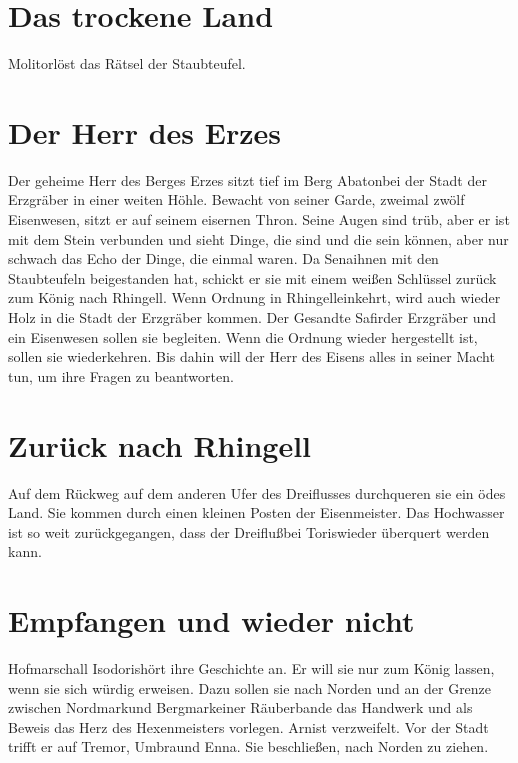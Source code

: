 \documentclass[12pt,a4paper,onecolumn,twoside,ngerman]{book}
\newcommand{\Molitor}{Molitor}
\newcommand{\Sena}{Sena}
\newcommand{\Umbra}{Umbra}
\newcommand{\Enna}{Enna}
\newcommand{\Tremor}{Tremor}
\newcommand{\Nordmark}{Nordmark}
\newcommand{\Bergmark}{Bergmark}
\newcommand{\Arn}{Arn}
\newcommand{\Rhingell}{Rhingell}
\newcommand{\Isodoris}{Isodoris}
\newcommand{\Dreifluss}{Dreifluß}
\newcommand{\Toris}{Toris}
\newcommand{\Eisenmeister}{Eisenmeister}
\newcommand{\Abaton}{Abaton}
\newcommand{\Safir}{Safir}
\newcommand{\Staubteufel}{Staubteufel}
\begin{document}
\section{Das trockene Land}
\Molitor löst das Rätsel der \Staubteufel .

\section{Der Herr des Erzes}
Der geheime Herr des Berges Erzes sitzt tief im Berg \Abaton bei der Stadt der Erzgräber in einer weiten Höhle. Bewacht von seiner Garde, zweimal zwölf Eisenwesen, sitzt er auf seinem eisernen Thron. Seine Augen sind trüb, aber er ist mit dem Stein verbunden und sieht Dinge, die sind und die sein können, aber nur schwach das Echo der Dinge, die einmal waren. 
Da \Sena ihnen mit den Staubteufeln beigestanden hat, schickt er sie mit einem weißen Schlüssel zurück zum König nach \Rhingell . Wenn Ordnung in \Rhingell einkehrt, wird auch wieder Holz in die Stadt der Erzgräber kommen. Der Gesandte \Safir der Erzgräber und ein Eisenwesen sollen sie begleiten. Wenn die Ordnung wieder hergestellt ist, sollen sie wiederkehren. Bis dahin will der Herr des Eisens alles in seiner Macht tun, um ihre Fragen zu beantworten.

\section{Zurück nach \Rhingell}
Auf dem Rückweg auf dem anderen Ufer des Dreiflusses durchqueren sie ein ödes Land. Sie kommen durch einen kleinen Posten der \Eisenmeister. 
Das Hochwasser ist so weit zurückgegangen, dass der \Dreifluss bei \Toris wieder überquert werden kann.


\section{Empfangen und wieder nicht}
Hofmarschall \Isodoris hört ihre Geschichte an. Er will sie nur zum König lassen, wenn sie sich würdig erweisen. Dazu sollen sie nach Norden und an der Grenze zwischen \Nordmark und \Bergmark einer Räuberbande das Handwerk und als Beweis das Herz des Hexenmeisters vorlegen. \Arn ist verzweifelt. Vor der Stadt trifft er auf \Tremor , \Umbra und \Enna . Sie beschließen, nach Norden zu ziehen.
\end{document}

